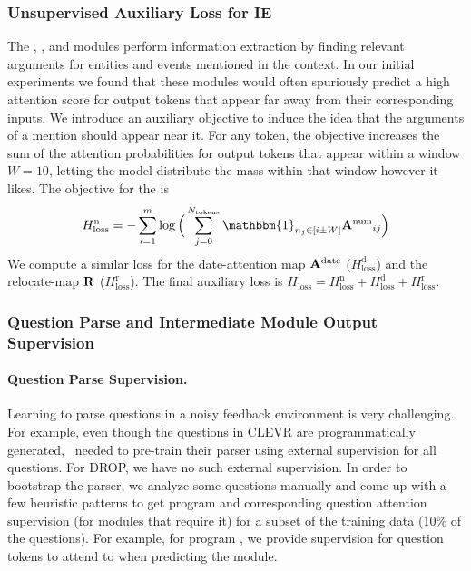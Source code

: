 \documentclass[main.tex]{subfiles}
\begin{document}
\subsubsection{Unsupervised Auxiliary Loss for IE}
\label{sssec:hloss}
The , , and  modules perform information extraction by finding relevant arguments for entities and events mentioned in the context. In our initial experiments we found that these modules would often spuriously predict a high attention score for output tokens that appear far away from their corresponding inputs.
We introduce an auxiliary objective to induce the idea that the arguments of a mention should appear near it.
For any token, the objective increases the sum of the attention probabilities for output tokens that appear within a window $W=10$, letting the model distribute the mass within that window however it likes.
The objective for the  is
\begin{equation*}
    H^{\text{n}}_{\text{loss}} = - \sum_{i=1}^{m} \log \Big(\sum_{j=0}^{\Ntokens} \mathbbm{1}_{n_{j} \in [i\pm W]} \mB{A^{\text{num}}}_{ij}\Big)
\end{equation*}
We compute a similar loss for the date-attention map $\mathbf{A^{\text{date}}}$ ($H^{\text{d}}_{\text{loss}}$) and the relocate-map $\mathbf{R}$ ($H^{\text{r}}_{\text{loss}}$). The final auxiliary loss is
$H_{\text{loss}} = H^{\text{n}}_{\text{loss}} + H^{\text{d}}_{\text{loss}} + H^{\text{r}}_{\text{loss}}$.

\subsubsection{Question Parse and Intermediate Module Output Supervision}
\label{sssec:hqsup}
\paragraph{Question Parse Supervision.}
Learning to parse questions in a noisy feedback environment is very challenging.
For example, even though the questions in CLEVR are programmatically generated,~ needed to pre-train their parser using external supervision for all questions. For DROP, we have no such external supervision. In order to bootstrap the parser, we analyze some questions manually and come up with a few heuristic patterns to get program and corresponding question attention supervision (for modules that require it) for a subset of the training data (10\% of the questions).
For example, for program , we provide supervision for question tokens to attend to when predicting the  module.
\end{document}
